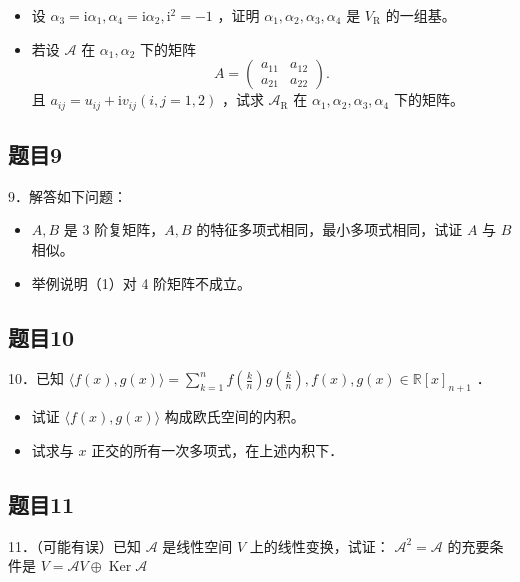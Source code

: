 \documentclass{article}
\begin{document}
\begin{itemize}
  \item[（1）] 设 \(\alpha_{3}=\mathrm{i} \alpha_{1}, \alpha_{4}=\mathrm{i} \alpha_{2}, \mathrm{i}^{2}=-1\) ，证明 \(\alpha_{1}, \alpha_{2}, \alpha_{3}, \alpha_{4}\) 是 \(V_{\mathrm{R}}\) 的一组基。
  \item[（2）] 若设 \(\mathcal{A}\) 在 \(\alpha_{1}, \alpha_{2}\) 下的矩阵
\[
A=\left(\begin{array}{ll}
a_{11} & a_{12} \\
a_{21} & a_{22}
\end{array}\right) .
\]
且 \(a_{i j}=u_{i j}+\mathrm{i} v_{i j}(i, j=1,2)\) ，试求 \(\mathcal{A}_{\mathrm{R}}\) 在 \(\alpha_{1}, \alpha_{2}, \alpha_{3}, \alpha_{4}\) 下的矩阵。
\end{itemize}

\subsection{题目9}
9．解答如下问题：

\begin{itemize}
  \item[（1）] \(A, B\) 是 3 阶复矩阵，\(A, B\) 的特征多项式相同，最小多项式相同，试证 \(A\) 与 \(B\) 相似。
  \item[（2）] 举例说明（1）对 4 阶矩阵不成立。
\end{itemize}

\subsection{题目10}
10．已知 \(\langle f(x), g(x)\rangle=\sum_{k=1}^{n} f\left(\frac{k}{n}\right) g\left(\frac{k}{n}\right), f(x), g(x) \in \mathbb{R}[x]_{n+1}\) ．

\begin{itemize}
  \item[（1）] 试证 \(\langle f(x), g(x)\rangle\) 构成欧氏空间的内积。
  \item[（2）] 试求与 \(x\) 正交的所有一次多项式，在上述内积下．
\end{itemize}

\subsection{题目11}
11．（可能有误）已知 \(\mathcal{A}\) 是线性空间 \(V\) 上的线性变换，试证： \(\mathcal{A}^{2}=\mathcal{A}\) 的充要条件是 \(V=\mathcal{A} V \oplus \operatorname{Ker} \mathcal{A}\)
\end{document}
